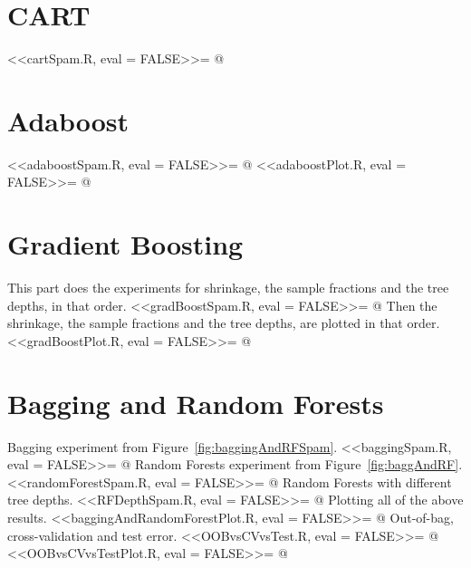 \section{CART}
<<cartSpam.R, eval = FALSE>>=
@

\section{Adaboost}
<<adaboostSpam.R, eval = FALSE>>=
@
<<adaboostPlot.R, eval = FALSE>>=
@

\section{Gradient Boosting}
This part does the experiments for shrinkage, the sample fractions and the tree depths, in that order.
<<gradBoostSpam.R, eval = FALSE>>=
@
Then the shrinkage, the sample fractions and the tree depths, are plotted in that order.
<<gradBoostPlot.R, eval = FALSE>>=
@

\section{Bagging and Random Forests}
Bagging experiment from Figure~\ref{fig:baggingAndRFSpam}.
<<baggingSpam.R, eval = FALSE>>=
@
Random Forests experiment from Figure~\ref{fig:baggAndRF}.
<<randomForestSpam.R, eval = FALSE>>=
@
Random Forests with different tree depths.
<<RFDepthSpam.R, eval = FALSE>>=
@
Plotting all of the above results.
<<baggingAndRandomForestPlot.R, eval = FALSE>>=
@
Out-of-bag, cross-validation and test error.
<<OOBvsCVvsTest.R, eval = FALSE>>=
@
<<OOBvsCVvsTestPlot.R, eval = FALSE>>=
@

